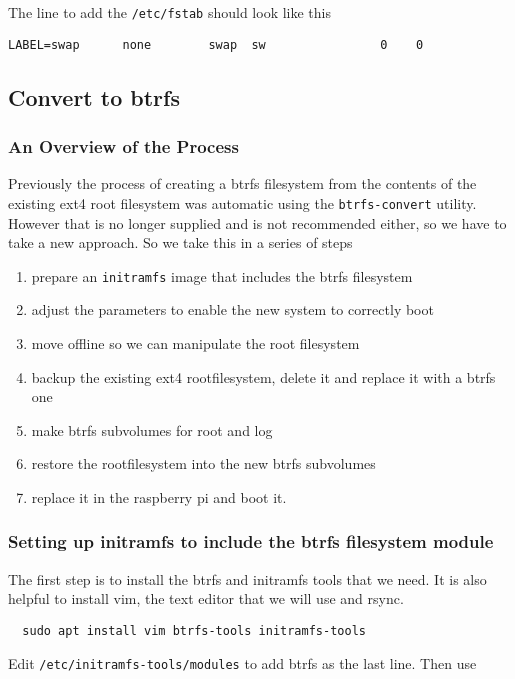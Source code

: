 \documentclass[Draft]{akc}
\begin{document}
The line to add the \texttt{/etc/fstab} should look like this
\begin{lstlisting}
LABEL=swap      none        swap  sw                0    0
\end{lstlisting}


\subsection{Convert to btrfs}
\subsubsection{An Overview of the Process}
Previously the process of creating a btrfs filesystem from the contents of the existing ext4 root filesystem was
automatic using the \texttt{btrfs-convert} utility.  However that is no longer supplied and is not recommended either,
so we have to take a new approach.  So we take this in a series of steps
\begin{enumerate}
  \item prepare an \texttt{initramfs} image that includes the btrfs filesystem
  \item adjust the parameters to enable the new system to correctly boot
  \item move offline so we can manipulate the root filesystem
  \item backup the existing ext4 rootfilesystem, delete it and replace it with a btrfs one
  \item make btrfs subvolumes for root and log
  \item restore the rootfilesystem into the new btrfs subvolumes
  \item replace it in the raspberry pi and boot it.
\end{enumerate}

\subsubsection{Setting up initramfs to include the btrfs filesystem module}

The first step is to install the btrfs and initramfs tools that we need. It is also helpful to
install vim, the text editor that we will use and rsync.

\begin{lstlisting}
  sudo apt install vim btrfs-tools initramfs-tools
\end{lstlisting}

Edit \texttt{/etc/initramfs-tools/modules} to add btrfs as the last line. Then use
\end{document}
